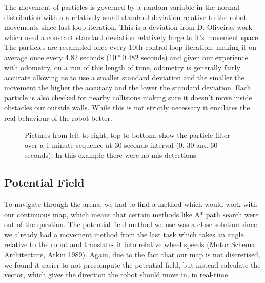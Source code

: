 \documentclass[paper=a4, fontsize=12pt]{scrartcl}	%
\numberwithin{equation}{section}		%
\numberwithin{figure}{section}			%
\numberwithin{table}{section}				%
\begin{document}
The movement of particles is governed by a random variable in the normal distribution with a a relatively small standard deviation relative to the robot movements since last loop iteration. This is a deviation from D. Oliveiras work which used a constant standard deviation relatively large to it's movement space. The particles are resampled once every 10th control loop iteration, making it on average once every 4.82 seconds (\(10* 0.482\text{ seconds}\)) and given our experience with odometry, on a run of this length of time, odometry is generally fairly accurate allowing us to use a smaller standard deviation and the smaller the movement the higher the accuracy and the lower the standard deviation. Each particle is also checked for nearby collisions making sure it doesn't move inside obstacles our outside walls. While this is not strictly necessary it emulates the real behaviour of the robot better.

\begin{figure}[ht!]
  \begin{minipage}[b]{0.45\linewidth}
    \centering
    \setlength\fboxsep{0pt}
    \setlength\fboxrule{1pt}
    \fbox{\texttt{[image: pf1]}}
  \end{minipage}
  \hspace{0.5cm}
  \begin{minipage}[b]{0.45\linewidth}
    \centering
    \setlength\fboxsep{0pt}
    \setlength\fboxrule{1pt}
    \fbox{\texttt{[image: pf2]}}
  \end{minipage}
\end{figure}
\begin{figure}[ht!]
  \begin{minipage}[b]{0.45\linewidth}
    \setlength\fboxsep{0pt}
    \setlength\fboxrule{1pt}
    \fbox{\texttt{[image: pf3]}}
  \end{minipage}
  \label{pfpics}
  \caption{Pictures from left to right, top to bottom, show the particle filter over a 1 minute sequence at 30 seconds interval (0, 30 and 60 seconds). In this example there were no mis-detections.}
\end{figure}

\subsection{Potential Field}
To navigate through the arena, we had to find a method which would work with our continuous map, which meant that certain methods like A* path search were out of the question. The potential field method we use was a close solution since we already had a movement method from the last task which takes an angle relative to the robot and translates it into relative wheel speeds (Motor Schema Architecture, Arkin 1989). Again, due to the fact that our map is not discretised, we found it easier to not precompute the potential field, but instead calculate the vector, which gives the direction the robot should move in, in real-time.
\end{document}
